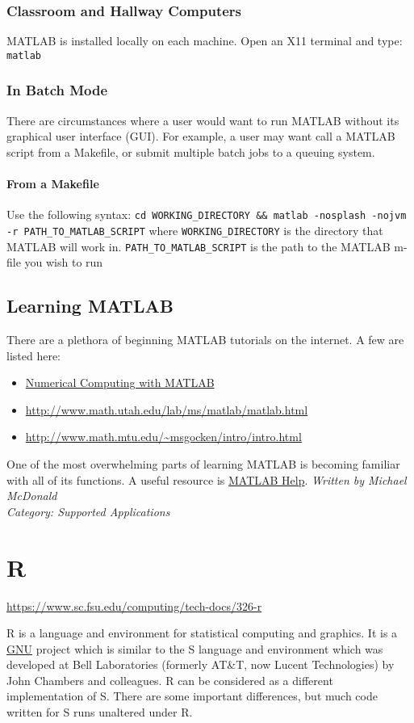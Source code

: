 \documentclass[12pt,a4paper]{article}
\begin{document}
\subsubsection*{Classroom and Hallway Computers}
MATLAB is installed locally on each machine.
Open an X11 terminal and type: \texttt{matlab}
\subsubsection*{In Batch Mode}
There are circumstances where a user would want to run MATLAB without its graphical user interface (GUI). For example, a user may want call a MATLAB script from a Makefile, or submit multiple batch jobs to a queuing system.
\paragraph{From a Makefile}
Use the following syntax:
\texttt{cd WORKING\_DIRECTORY \&\& matlab -nosplash -nojvm -r PATH\_TO\_MATLAB\_SCRIPT}
where \texttt{WORKING\_DIRECTORY} is the directory that MATLAB will work in.
\texttt{PATH\_TO\_MATLAB\_SCRIPT} is the path to the MATLAB m-file you wish to run

\subsection*{Learning MATLAB}
There are a plethora of beginning MATLAB tutorials on the internet. A few are listed here:
\begin{itemize}
    \item \href{http://www.math.unm.edu/~wz/hpced/matlab.pdf}{Numerical Computing with MATLAB}
    \item \url{http://www.math.utah.edu/lab/ms/matlab/matlab.html}
    \item \url{http://www.math.mtu.edu/~msgocken/intro/intro.html}
\end{itemize}
One of the most overwhelming parts of learning MATLAB is becoming familiar with all of its functions. A useful resource is \href{https://www.mathworks.com/help/matlab/}{MATLAB Help}.
\hfill \textit{Written by Michael McDonald} \\
\hfill \textit{Category: Supported Applications}

\section{R}
\url{https://www.sc.fsu.edu/computing/tech-docs/326-r}

R is a language and environment for
statistical computing and graphics. It is a \href{http://www.gnu.org/}{GNU} project
which is similar to the S language and environment which
was developed at Bell Laboratories (formerly AT\&T, now Lucent
Technologies) by John Chambers and colleagues. R can be considered as
a different implementation of S. There are some important differences,
but much code written for S runs unaltered under R.
\end{document}
